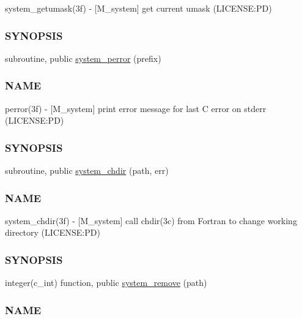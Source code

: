 \begin{DoxyCompactItemize}
\begin{DoxyCompactList}
system\+\_\+getumask(3f) -\/ \mbox{[}M\+\_\+system\mbox{]} get current umask (L\+I\+C\+E\+N\+SE\+:PD) \subsubsection*{S\+Y\+N\+O\+P\+S\+IS}\end{DoxyCompactList}\item 
subroutine, public \mbox{\hyperlink{namespacem__system_afae451a1fc5432274dc1f75a364051b4}{system\+\_\+perror}} (prefix)
\begin{DoxyCompactList}\small\item\em \subsubsection*{N\+A\+ME}

perror(3f) -\/ \mbox{[}M\+\_\+system\mbox{]} print error message for last C error on stderr (L\+I\+C\+E\+N\+SE\+:PD) \subsubsection*{S\+Y\+N\+O\+P\+S\+IS}\end{DoxyCompactList}\item 
subroutine, public \mbox{\hyperlink{namespacem__system_a47746b670cb21bae0957c9bb2bccf209}{system\+\_\+chdir}} (path, err)
\begin{DoxyCompactList}\small\item\em \subsubsection*{N\+A\+ME}

system\+\_\+chdir(3f) -\/ \mbox{[}M\+\_\+system\mbox{]} call chdir(3c) from Fortran to change working directory (L\+I\+C\+E\+N\+SE\+:PD) \subsubsection*{S\+Y\+N\+O\+P\+S\+IS}\end{DoxyCompactList}\item 
integer(c\+\_\+int) function, public \mbox{\hyperlink{namespacem__system_a730ae64294e3cd73bde8f0c63cdf9972}{system\+\_\+remove}} (path)
\begin{DoxyCompactList}\small\item\em \subsubsection*{N\+A\+ME}


\end{DoxyCompactList}
\end{DoxyCompactItemize}
